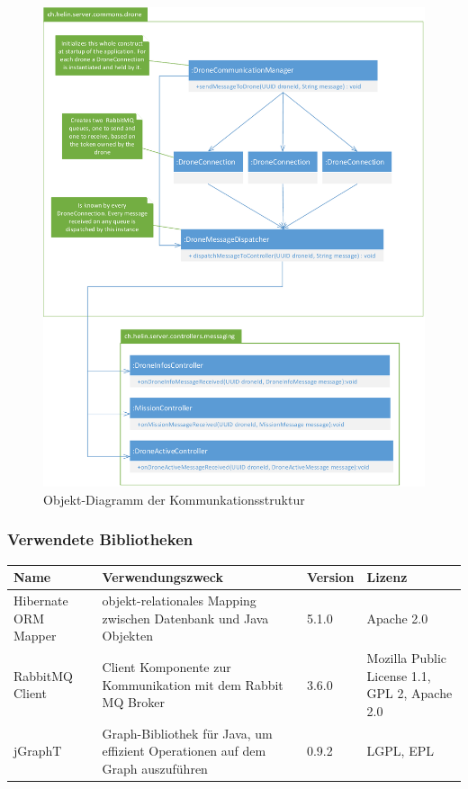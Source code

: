 \begin{figure}[H]
	\centering
	\includegraphics[width=0.8\paperwidth] {images/drone-communication-diagram.pdf}
	\caption{Objekt-Diagramm der Kommunkationsstruktur}
	\label{fig:drone-communication-diagram}
\end{figure}

\subsubsection{Verwendete Bibliotheken}


\begin{tabularx}{\textwidth}{|l|X|l|X|}
	\hline
	\textbf{Name} & \textbf{Verwendungszweck} & \textbf{Version} & \textbf{Lizenz} \\
	\hline \hline
	Hibernate ORM Mapper & objekt-relationales Mapping zwischen Datenbank und Java Objekten  & 5.1.0 & Apache 2.0\\
	\hline 
	RabbitMQ Client & Client Komponente zur Kommunikation mit dem Rabbit MQ Broker & 3.6.0 &  Mozilla Public License 1.1, GPL 2, Apache 2.0 \\
	\hline 
	jGraphT & Graph-Bibliothek für Java, um effizient Operationen auf dem Graph auszuführen & 0.9.2 &  LGPL, EPL \\
	\hline 
\end{tabularx} \\

